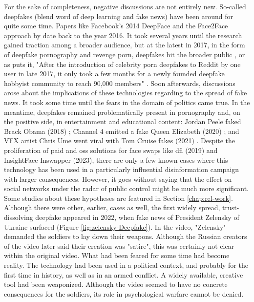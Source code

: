\documentclass[
  a4paper,  %
  twoside,  %
  bibliography=totoc,
  headsepline,
  cleardoublepage=empty,
  parskip=half,
  draft=false
]{scrbook}
\begin{document}
For the sake of completeness, negative discussions are not entirely new. So-called deepfakes (blend word of deep learning and fake news) have been around for quite some time. Papers like Facebook's 2014 DeepFace \cite{taigmanDeepFaceClosingGap2014} and the Face2Face approach by \citet{thiesFace2FaceRealtimeFace2020} date back to the year 2016. It took several years until the research gained traction among a broader audience, but at the latest in 2017, in the form of deepfake pornography and revenge porn, deepfakes hit the broader public \cite{coleAIAssistedFakePorn2017}, or as \citeauthor{westerlundEmergenceDeepfakeTechnology2019a} puts it, "After the introduction of celebrity porn deepfakes to Reddit by one user in late 2017, it only took a few months for a newly founded deepfake hobbyist community to reach 90,000 members" \cite{westerlundEmergenceDeepfakeTechnology2019a}. Soon afterwards, discussions arose about the implications of these technologies regarding to the spread of fake news. It took some time until the fears in the domain of politics came true. In the meantime, deepfakes remained problematically present in pornography and, on the positive side, in entertainment and educational content: Jordan Peele faked Brack Obama (2018) \cite{vincentWatchJordanPeele2018}; Channel 4 emitted a fake Queen Elizabeth (2020) \cite{DeepfakeQueenDeliver2020}; and VFX artist Chris Ume went viral with Tom Cruise fakes (2021) \cite{vincentTomCruiseDeepfake2021}. Despite the proliferation of paid and \gls{oss} solutions for face swaps like \gls{dfl} (2019) and InsightFace Inswapper (2023), there are only a few known cases where this technology has been used in a particularly influential disinformation campaign with larger consequences. However, it goes without saying that the effect on social networks under the radar of public control might be much more significant. Some studies about these hypotheses are featured in Section \ref{chap:rel-work}. \\
Although there were other, earlier, cases as well, the first widely spread, trust-dissolving deepfake appeared in 2022, when fake news of President Zelensky of Ukraine surfaced (Figure \ref{fig:zelensky-Deepfake}). In the video, "Zelensky" demanded the soldiers to lay down their weapons. Although the Russian creators of the video later said their creation was "satire", this was certainly not clear within the original video. What had been feared for some time had become reality. The technology had been used in a political context, and probably for the first time in history, as well as in an armed conflict. A widely available, creative tool had been weaponized. Although the video seemed to have no concrete consequences for the soldiers, its role in psychological warfare cannot be denied.
\end{document}
